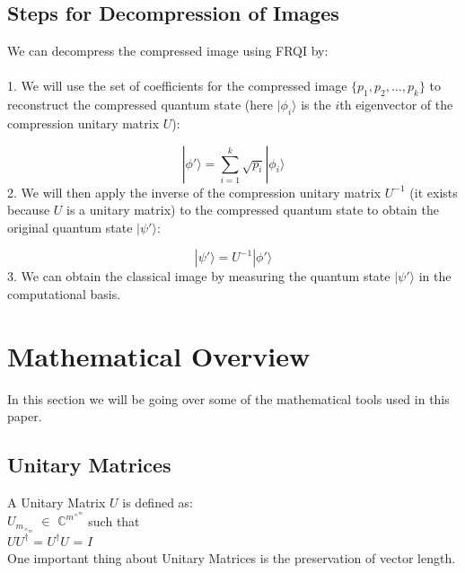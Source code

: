 \documentclass[letterpaper, 12pt]{article}
\begin{document}
\subsection{Steps for Decompression of Images}
We can decompress the compressed image using FRQI by:\\\\
1. We will use the set of coefficients for the compressed image $\{p_1, p_2, ..., p_k\}$ to reconstruct the compressed quantum state (here $|\phi_i\rangle$ is the $i$th eigenvector of the compression unitary matrix $U$):

$$
|\phi'\rangle = \sum_{i=1}^k \sqrt{p_i} |\phi_i\rangle
$$
2. We will then apply the inverse of the compression unitary matrix $U^{-1}$ (it exists because $U$ is a unitary matrix) to the compressed quantum state to obtain the original quantum state $|\psi'\rangle$:

$$
|\psi'\rangle = U^{-1}|\phi'\rangle
$$
3. We can obtain the classical image by measuring the quantum state $|\psi'\rangle$ in the computational basis. \\


\section{Mathematical Overview}
In this section we will be going over some of the mathematical tools used in this paper.

\subsection{Unitary Matrices}
A Unitary Matrix $U$ is defined as:\\
$U_m_\times_m$ $\in$ $\mathbb{C}^m^\times^m$ such that\\
$U$$U^\dag$ = $U^\dag$$U$ = $I$\\
One important thing about Unitary Matrices is the preservation of vector length.
\end{document}
